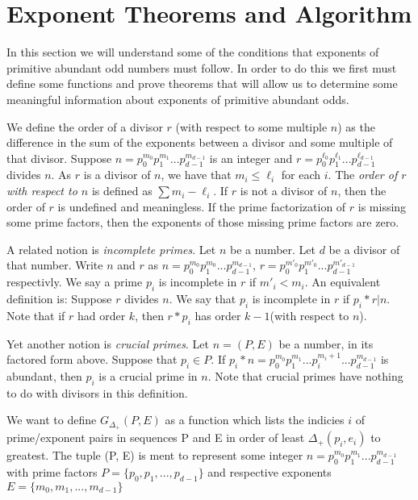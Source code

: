 \documentclass[../paper.tex]{subfiles}
\begin{document}
\section{Exponent Theorems and Algorithm}

In this section we will understand some of the conditions that
exponents of primitive abundant odd numbers must follow. In order
to do this we first must define some functions and prove theorems 
that will allow us to determine some meaningful information about
exponents of primitive abundant odds.

We define the order of a divisor $r$ (with respect to some multiple
$n$) as the difference in the sum of the exponents between a
divisor and some multiple of that divisor. Suppose $n = p_0^{m_0}
p_1^{m_1} ... p_{d-1}^{m_{d-1}}$ is an integer and $r = p_0^{\ell_0}
p_1^{\ell_1} ... p_{d-1}^{\ell_{d-1}}$ divides $n$. 
As $r$ is a divisor of $n$, we have that $m_i \leq \ell_i$ for 
each $i$. The \textit{order of $r$ with respect to $n$} is defined
as $\sum {m_i - \ell_i}$. If $r$ is not a divisor of $n$, then the
order of $r$ is undefined and meaningless. If the prime 
factorization of $r$ is missing some prime factors, then the 
exponents of those missing prime factors are zero.

A related notion is \textit{incomplete primes}. Let $n$ be a
number. Let $d$ be a divisor of that number.
Write $n$ and $r$ as $n = p_0^{m_0} p_1^{m_0}...
p_{d-1}^{m_{d-1}}$, $r = p_0^{m'_0} p_1^{m'_0} ... 
p_{d-1}^{m'_{d-1}}$ respectivly. We say a prime $p_i$ is 
incomplete in $r$ if $m'_i < m_i$. An equivalent definition is: 
Suppose $r$ divides $n$. We say that $p_i$ is incomplete in $r$ 
if $p_i * r | n$. Note that if $r$ had order $k$, then $r * p_i$
has order $k-1$(with respect to $n$). 

Yet another notion is \textit{crucial primes}. Let $n = (P,E)$ 
be a number, in its factored form above. Suppose that $p_i \in P$.
If $p_i * n = p_0^{m_0} p_1^{m_1} ... p_{i}^{m_i + 1} ...
p_{d-1}^{m_{d-1}}$ is abundant, then $p_i$ is a crucial prime in
$n$. Note that crucial primes have nothing to do with divisors in
this definition.

We want to define $G_{\Delta_{+}}(P,E)$ as a function which lists
the indicies $i$ of prime/exponent pairs in sequences P and E
in order of least $\Delta_{+}(p_i, e_i)$ to greatest. The tuple
(P, E) is ment to represent some integer $n = p_0^{m_0} p_1^{m_1}
... p_{d-1}^{m_{d-1}}$ with prime factors $P = \{p_0, p_1, ..., 
p_{d-1}\}$ and respective exponents $E = \{m_0, m_1, ...,
m_{d-1}\}$ 
\\
\end{document}

